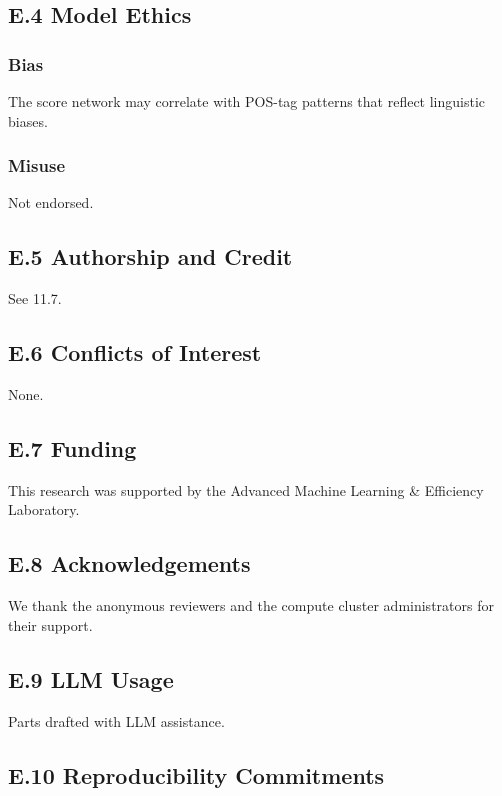 \subsection{E.4 Model Ethics}

\subsubsection{Bias}
The score network may correlate with POS-tag patterns that reflect 
linguistic biases.

\subsubsection{Misuse}
Not endorsed.

\subsection{E.5 Authorship and Credit}

See  11.7.

\subsection{E.6 Conflicts of Interest}

None.

\subsection{E.7 Funding}

This research was supported by the Advanced Machine Learning & Efficiency Laboratory.

\subsection{E.8 Acknowledgements}

We thank the anonymous reviewers and the compute cluster administrators for their support.

\subsection{E.9 LLM Usage}

Parts drafted with LLM assistance.

\subsection{E.10 Reproducibility Commitments}


